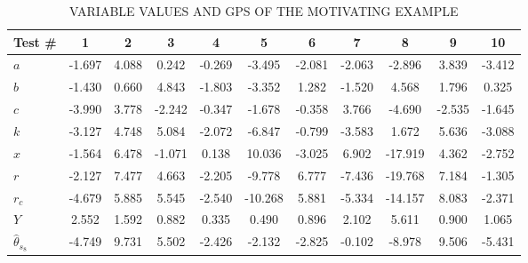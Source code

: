 \documentclass[times]{stvrauth}
\begin{document}
\begin{table}[htbp!]
\caption{VARIABLE VALUES AND GPS OF THE MOTIVATING EXAMPLE}
\label{exampledata}
\centering
      \begin{tabular}{|l|c|c|c|c|c|c|c|c|c|c|}
      \hline
Test \#	&1	&2&3&4 & 5 &6& 7 & 8 & 9&10\\	\hline

$a$ &-1.697	&	4.088	&	0.242	&	-0.269	&	-3.495	&	-2.081	&	-2.063	&	-2.896	&	3.839	&	-3.412 \\ 	\hline
$b$ & -1.430	&	0.660	&	4.843	&	-1.803	&	-3.352	&	1.282	&	-1.520	&	4.568	&	1.796	&	0.325\\	\hline
$c$ & -3.990	&	3.778	&	-2.242	&	-0.347	&	-1.678	&	-0.358	&	3.766	&	-4.690	&	-2.535	&	-1.645 \\	\hline
$k$ & -3.127	&	4.748	&	5.084	&	-2.072	&	-6.847	&	-0.799	&	-3.583	&	1.672	&	5.636	&	-3.088\\	\hline
$x$ &-1.564	&	6.478	&	-1.071	&	0.138	&	10.036	&	-3.025	&	6.902	&	-17.919	&	4.362	&	-2.752 \\	\hline
$r $& -2.127	&	7.477	&	4.663	&	-2.205	&	-9.778	&	6.777	&	-7.436	&	-19.768	&	7.184	&	-1.305\\	\hline
$r_c$ & -4.679	&	5.885	&	5.545	&	-2.540	&	-10.268	&	5.881	&	-5.334	&	-14.157	&	8.083	&	-2.371 \\	\hline
$Y$ & 2.552	&	1.592	&	0.882	&	0.335	&	0.490	&	0.896	&	2.102	&	5.611	&	0.900	&	1.065 \\	\hline
${\hat{\theta}}_{s_8}$ & -4.749	&	9.731	&	5.502	&	-2.426	&	-2.132	&	-2.825	&	-0.102	&	-8.978	&	9.506	&	-5.431\\	\hline

\end{tabular}
\end{table}
\end{document}
